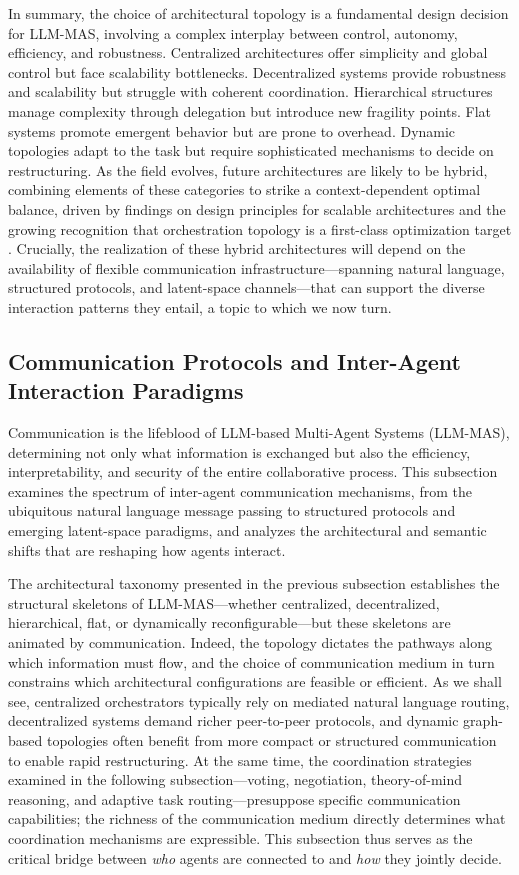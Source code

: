\documentclass[11pt]{article}
\begin{document}
In summary, the choice of architectural topology is a fundamental design decision for LLM-MAS, involving a complex interplay between control, autonomy, efficiency, and robustness. Centralized architectures offer simplicity and global control but face scalability bottlenecks. Decentralized systems provide robustness and scalability but struggle with coherent coordination. Hierarchical structures manage complexity through delegation but introduce new fragility points. Flat systems promote emergent behavior but are prone to overhead. Dynamic topologies adapt to the task but require sophisticated mechanisms to decide on restructuring. As the field evolves, future architectures are likely to be hybrid, combining elements of these categories to strike a context-dependent optimal balance, driven by findings on design principles for scalable architectures \cite{ref49} and the growing recognition that orchestration topology is a first-class optimization target \cite{ref62}. Crucially, the realization of these hybrid architectures will depend on the availability of flexible communication infrastructure---spanning natural language, structured protocols, and latent-space channels---that can support the diverse interaction patterns they entail, a topic to which we now turn.

\subsection{Communication Protocols and Inter-Agent Interaction Paradigms}

Communication is the lifeblood of LLM-based Multi-Agent Systems (LLM-MAS), determining not only what information is exchanged but also the efficiency, interpretability, and security of the entire collaborative process. \cite{ref7} This subsection examines the spectrum of inter-agent communication mechanisms, from the ubiquitous natural language message passing to structured protocols and emerging latent-space paradigms, and analyzes the architectural and semantic shifts that are reshaping how agents interact.

The architectural taxonomy presented in the previous subsection establishes the structural skeletons of LLM-MAS---whether centralized, decentralized, hierarchical, flat, or dynamically reconfigurable---but these skeletons are animated by communication. Indeed, the topology dictates the pathways along which information must flow, and the choice of communication medium in turn constrains which architectural configurations are feasible or efficient. As we shall see, centralized orchestrators typically rely on mediated natural language routing, decentralized systems demand richer peer-to-peer protocols, and dynamic graph-based topologies often benefit from more compact or structured communication to enable rapid restructuring. At the same time, the coordination strategies examined in the following subsection---voting, negotiation, theory-of-mind reasoning, and adaptive task routing---presuppose specific communication capabilities; the richness of the communication medium directly determines what coordination mechanisms are expressible. This subsection thus serves as the critical bridge between \emph{who} agents are connected to and \emph{how} they jointly decide.
\end{document}
